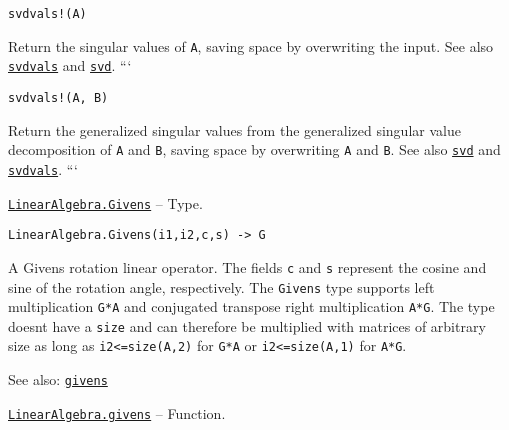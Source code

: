 \begin{adjustwidth}{2em}{0pt}


\begin{verbatim}
svdvals!(A)
\end{verbatim}

Return the singular values of \texttt{A}, saving space by overwriting the input. See also \hyperlink{12905968661134086149}{\texttt{svdvals}} and \hyperlink{6661056220970412040}{\texttt{svd}}. ```




\begin{lstlisting}
svdvals!(A, B)
\end{lstlisting}

Return the generalized singular values from the generalized singular value decomposition of \texttt{A} and \texttt{B}, saving space by overwriting \texttt{A} and \texttt{B}. See also \hyperlink{6661056220970412040}{\texttt{svd}} and \hyperlink{12905968661134086149}{\texttt{svdvals}}. ```



\end{adjustwidth}
\hypertarget{7608839947605749416}{} 
\hyperlink{7608839947605749416}{\texttt{LinearAlgebra.Givens}}  -- {Type.}

\begin{adjustwidth}{2em}{0pt}


\begin{verbatim}
LinearAlgebra.Givens(i1,i2,c,s) -> G
\end{verbatim}

A Givens rotation linear operator. The fields \texttt{c} and \texttt{s} represent the cosine and sine of the rotation angle, respectively. The \texttt{Givens} type supports left multiplication \texttt{G*A} and conjugated transpose right multiplication \texttt{A*G{\textquotesingle}}. The type doesn{\textquotesingle}t have a \texttt{size} and can therefore be multiplied with matrices of arbitrary size as long as \texttt{i2<=size(A,2)} for \texttt{G*A} or \texttt{i2<=size(A,1)} for \texttt{A*G{\textquotesingle}}.

See also: \hyperlink{16453376059429157444}{\texttt{givens}}



\end{adjustwidth}
\hypertarget{16453376059429157444}{} 
\hyperlink{16453376059429157444}{\texttt{LinearAlgebra.givens}}  -- {Function.}

